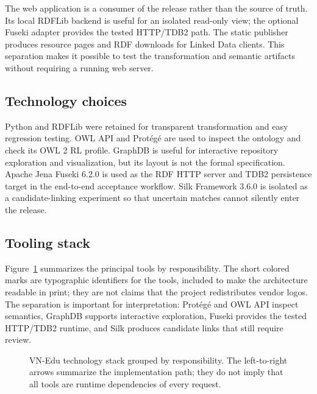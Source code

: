 The web application is a consumer of the release rather than the source of truth. Its local
RDFLib backend is useful for an isolated read-only view; the optional Fuseki adapter provides
the tested HTTP/TDB2 path. The static publisher produces resource pages and RDF downloads for
Linked Data clients. This separation makes it possible to test the transformation and semantic
artifacts without requiring a running web server.

\subsection{Technology choices}
Python and RDFLib were retained for transparent transformation and easy regression testing.
OWL API and Protégé are used to inspect the ontology and check its OWL 2 RL profile. GraphDB
is useful for interactive repository exploration and visualization, but its layout is not the
formal specification. Apache Jena Fuseki 6.2.0 is used as the RDF HTTP server and TDB2
persistence target in the end-to-end acceptance workflow. Silk Framework 3.6.0 is isolated
as a candidate-linking experiment so that uncertain matches cannot silently enter the release.

\subsection{Tooling stack}
Figure~\ref{fig:tool-stack} summarizes the principal tools by responsibility. The short
colored marks are typographic identifiers for the tools, included to make the architecture
readable in print; they are not claims that the project redistributes vendor logos. The
separation is important for interpretation: Protégé and OWL API inspect semantics, GraphDB
supports interactive exploration, Fuseki provides the tested HTTP/TDB2 runtime, and Silk
produces candidate links that still require review.

\begin{figure}[htbp]\centering
\resizebox{\textwidth}{!}{}
\caption[VN-Edu technology stack]{VN-Edu technology stack grouped by responsibility. The
left-to-right arrows summarize the implementation path; they do not imply that all tools are
runtime dependencies of every request.}
\label{fig:tool-stack}
\end{figure}

